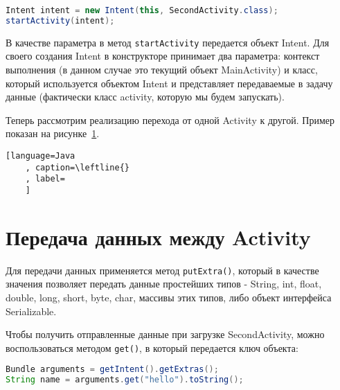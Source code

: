 \begin{lstlisting}[language=Java
	, caption=\leftline{Создание намеренья}
	]
Intent intent = new Intent(this, SecondActivity.class);
startActivity(intent);
\end{lstlisting}

В качестве параметра в метод \texttt{startActivity} передается объект Intent.
Для своего создания Intent в конструкторе принимает два параметра: контекст
выполнения (в данном случае это текущий объект MainActivity) и класс,
который используется объектом Intent и представляет передаваемые в задачу
данные (фактически класс activity, которую мы будем запускать).\par
Теперь рассмотрим реализацию перехода от одной Activity к другой.
Пример показан на рисунке~\ref{}.

\begin{lstlisting}[language=Java
	, caption=\leftline{}
	, label=
	]
\end{lstlisting}

\section{Передача данных между Activity}
Для передачи данных применяется метод \texttt{putExtra()}, который в качестве
значения позволяет передать данные простейших типов - String, int, float,
double, long, short, byte, char, массивы этих типов, либо объект интерфейса
Serializable.\par
Чтобы получить отправленные данные при загрузке SecondActivity, можно
воспользоваться методом \texttt{get()}, в который передается ключ объекта:

\begin{lstlisting}[language=Java
	, caption=\leftline{Получение намеренья}
	]
Bundle arguments = getIntent().getExtras();
String name = arguments.get("hello").toString();
\end{lstlisting}

